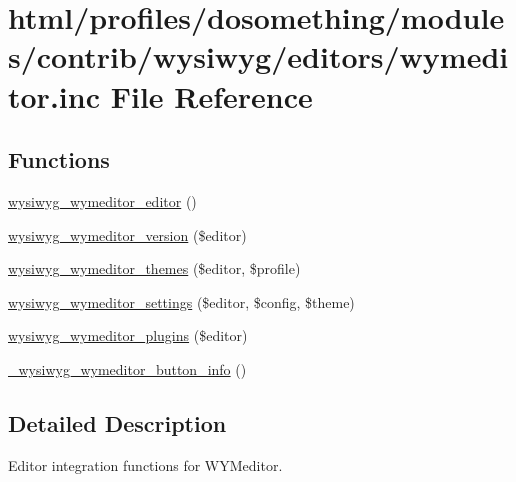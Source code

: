 \hypertarget{wymeditor_8inc}{
\section{html/profiles/dosomething/modules/contrib/wysiwyg/editors/wymeditor.inc File Reference}
\label{wymeditor_8inc}
}
\subsection*{Functions}
\begin{DoxyCompactItemize}
\item 
\hyperlink{wymeditor_8inc_a08d6b866852dae826ddb11be973dea64}{wysiwyg\_\-wymeditor\_\-editor} ()
\item 
\hyperlink{wymeditor_8inc_a64bf50fc3ee98619606f13b160edf7a8}{wysiwyg\_\-wymeditor\_\-version} (\$editor)
\item 
\hyperlink{wymeditor_8inc_a1e0a84cada74a2a5df209e79f62d5390}{wysiwyg\_\-wymeditor\_\-themes} (\$editor, \$profile)
\item 
\hyperlink{wymeditor_8inc_a55fa4e1255c1bbda1c4f7057aaaf8103}{wysiwyg\_\-wymeditor\_\-settings} (\$editor, \$config, \$theme)
\item 
\hyperlink{wymeditor_8inc_af8da2ce5ffdff89ca7b131dca3ad15d0}{wysiwyg\_\-wymeditor\_\-plugins} (\$editor)
\item 
\hyperlink{wymeditor_8inc_a9eb6f9d6321d723b17aa7c49b85c1143}{\_\-wysiwyg\_\-wymeditor\_\-button\_\-info} ()
\end{DoxyCompactItemize}


\subsection{Detailed Description}
Editor integration functions for WYMeditor. 

